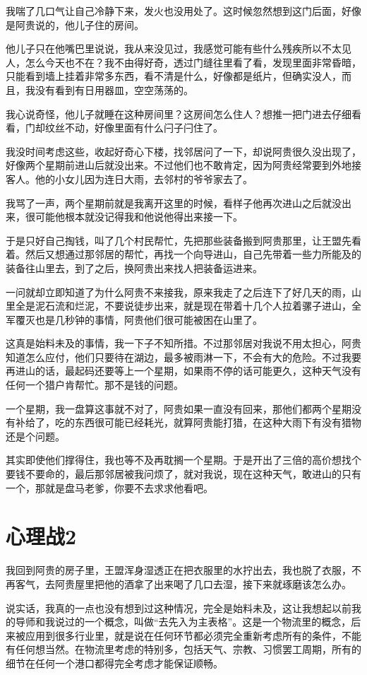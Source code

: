 我喘了几口气让自己冷静下来，发火也没用处了。这时候忽然想到这门后面，好像是阿贵说的，他儿子住的房间。

他儿子只在他嘴巴里说说，我从来没见过，我感觉可能有些什么残疾所以不太见人，怎么今天也不在？我不由得好奇，透过门缝往里看了看，发现里面非常昏暗，只能看到墙上挂着非常多东西，看不清是什么，好像都是纸片，但确实没人，而且，我没有看到有日用器皿，空空荡荡的。

我心说奇怪，他儿子就睡在这种房间里？这房间怎么住人？想推一把门进去仔细看看，门却纹丝不动，好像里面有什么闩子闩住了。

我没时间考虑这些，收起好奇心下楼，找邻居问了一下，却说阿贵很久没出现了，好像两个星期前进山后就没出来。不过他们也不敢肯定，因为阿贵经常要到外地接客人。他的小女儿因为连日大雨，去邻村的爷爷家去了。

我骂了一声，两个星期前就是我离开这里的时候，看样子他再次进山之后就没出来，很可能他根本就没记得我和他说他得出来接一下。

于是只好自己掏钱，叫了几个村民帮忙，先把那些装备搬到阿贵那里，让王盟先看着。然后又想通过那邻居的帮忙，再找一个向导进山，自己先带着一些力所能及的装备往山里去，到了之后，换阿贵出来找人把装备运进来。

一问就却立即知道了为什么阿贵不来接我，原来我走了之后连下了好几天的雨，山里全是泥石流和烂泥，不要说徒步出来，就是现在带着十几个人拉着骡子进山，全军覆灭也是几秒钟的事情，阿贵他们很可能被困在山里了。

这真是始料未及的事情，我一下子不知所措。不过那邻居对我说不用太担心，阿贵知道怎么应付，他们只要待在湖边，最多被雨淋一下，不会有大的危险。不过我要再进山的话，最起码还要等上一个星期，如果雨不停的话可能更久，这种天气没有任何一个猎户肯帮忙。那不是钱的问题。

一个星期，我一盘算这事就不对了，阿贵如果一直没有回来，那他们都两个星期没有补给了，吃的东西很可能已经耗光，就算阿贵能打猎，在这种大雨下有没有猎物还是个问题。

其实即使他们撑得住，我也等不及再耽搁一个星期。于是开出了三倍的高价想找个要钱不要命的，最后那邻居被我问烦了，就对我说，现在这种天气，敢进山的只有一个，那就是盘马老爹，你要不去求求他看吧。

\chapter{心理战2}

我回到阿贵的房子里，王盟浑身湿透正在把衣服里的水拧出去，我也脱了衣服，不再客气，去阿贵屋里把他的酒拿了出来喝了几口去湿，接下来就琢磨该怎么办。

说实话，我真的一点也没有想到过这种情况，完全是始料未及，这让我想起以前我的导师和我说过的一个概念，叫做“去先入为主表格”。这是一个物流里的概念，后来被应用到很多行业里，就是说在任何环节都必须完全重新考虑所有的条件，不能有任何想当然。在物流里考虑的特别多，包括天气、宗教、习惯罢工周期，所有的细节在任何一个港口都得完全考虑才能保证顺畅。

